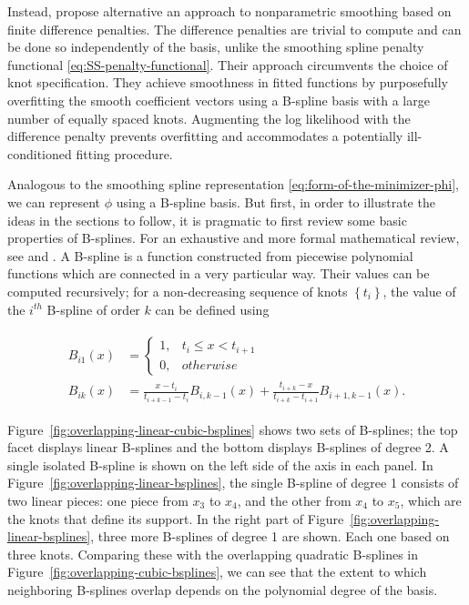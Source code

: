 \bigskip

Instead, \cite{eilers1996flexible} propose alternative an approach to nonparametric smoothing based on finite difference penalties. The difference penalties are trivial to compute and can be done so independently of the basis, unlike the smoothing spline penalty functional \eqref{eq:SS-penalty-functional}. Their approach circumvents the choice of knot specification. They achieve smoothness in fitted functions by purposefully overfitting the smooth coefficient vectors using a B-spline basis with a large number of equally spaced knots.  Augmenting the log likelihood with the difference penalty prevents overfitting and accommodates a potentially ill-conditioned fitting procedure. 

\bigskip

Analogous to the smoothing spline representation \eqref{eq:form-of-the-minimizer-phi}, we can represent $\phi$ using a B-spline basis. But first, in order to illustrate the ideas in the sections to follow, it is pragmatic to first review some basic properties of B-splines. For an exhaustive and more formal mathematical review, see  \cite{de1978practical} and \cite{dierckx1995curve}. A B-spline is a function constructed from piecewise polynomial functions which are connected in a very particular way. Their values can be computed recursively; for a non-decreasing sequence of knots $\left\{t_i\right\}$, the value of the $i^{th}$ B-spline of order $k$ can be defined using

\begin{align} 
\begin{split} \label{eq:bspline-recursive-relation}
B_{i1}\left(x\right) &= \left\{ \begin{array}{ll}
1, & t_i \le x < t_{i+1}\\
0, & otherwise
\end{array} \right.
\\
B_{ik}\left(x\right) &= \frac{x-t_i}{t_{i+k-1}-t_i}B_{i,k-1}\left(x\right) + \frac{t_{i+k}-x}{t_{i+k}-t_{i+1}}B_{i+1,k-1}\left(x\right). 
\end{split}
\end{align}

Figure~\ref{fig:overlapping-linear-cubic-bsplines} shows two sets of B-splines; the top facet displays linear B-splines and the bottom displays B-splines of degree 2. A single isolated B-spline is shown on the left side of the axis in each panel. In Figure~\ref{fig:overlapping-linear-bsplines}, the single B-spline of degree 1 consists of two linear pieces: one piece from $x_3$ to $x_4$, and the other from $x_4$ to $x_5$, which are the knots that define its support. In the right part of Figure~\ref{fig:overlapping-linear-bsplines}, three more B-splines of degree 1 are shown. Each one based on three knots. Comparing these with the overlapping quadratic B-splines in Figure~\ref{fig:overlapping-cubic-bsplines}, we can see that the extent to which neighboring B-splines overlap depends on the polynomial degree of the basis. 

